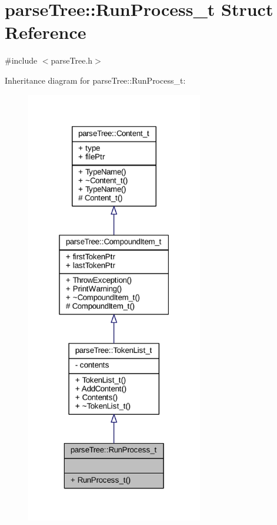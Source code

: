 \hypertarget{structparse_tree_1_1_run_process__t}{}\section{parse\+Tree\+:\+:Run\+Process\+\_\+t Struct Reference}
\label{structparse_tree_1_1_run_process__t}


{\ttfamily \#include $<$parse\+Tree.\+h$>$}



Inheritance diagram for parse\+Tree\+:\+:Run\+Process\+\_\+t\+:
\nopagebreak
\begin{figure}[H]
\begin{center}
\leavevmode
\includegraphics[width=219pt]{structparse_tree_1_1_run_process__t__inherit__graph}
\end{center}
\end{figure}


